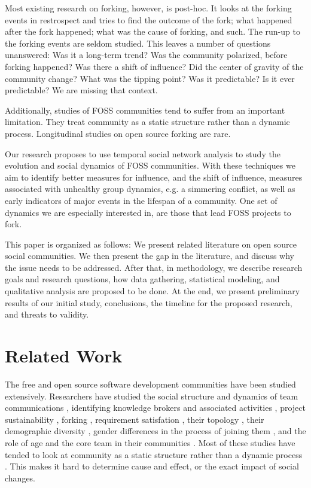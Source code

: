 \documentclass{acm_proc_article-sp}
\begin{document}
Most existing research on forking, however, is post-hoc. It looks at the forking events in restrospect and tries to find the outcome of the fork; what happened after the fork happened; what was the cause of forking, and such. The run-up to the forking events are seldom studied. This leaves a number of questions unanswered: Was it a long-term trend? Was the community polarized, before forking happened? Was there a shift of influence? Did the center of gravity of the community change? What was the tipping point? Was it predictable? Is it ever predictable? We are missing that context. 

Additionally, studies of FOSS communities tend to suffer from an important limitation. They treat community as a static structure rather than a dynamic process. Longitudinal studies on open source forking are rare.

Our research proposes to use temporal social network analysis to study the evolution and social dynamics of FOSS communities. With these techniques we aim to identify better measures for influence, and the shift of influence, measures associated with unhealthy group dynamics, e.g. a simmering conflict, as well as early indicators of major events in the lifespan of a community. One set of dynamics we are especially interested in, are those that lead FOSS projects to fork. 

This paper is organized as follows: We present related literature on open source social communities. We then present the gap in the literature, and discuss why the issue needs to be addressed. After that, in methodology, we describe research goals and research questions, how data gathering, statistical modeling, and qualitative analysis are proposed to be done. At the end, we present preliminary results of our initial study, conclusions, the timeline for the proposed research, and threats to validity.

\section{Related Work}
\label{relatedwork}

The free and open source software development communities have been studied extensively. Researchers have studied the social structure and dynamics of team communications \cite{Bird}\cite{HowisonSocialDynamics}\cite{HowisonFlossMole}\cite{Guzzi}\cite{Nakakoji}, identifying knowledge brokers and associated activities \cite{Sowe}, project sustainability \cite{NymanForkingSustainability}\cite{Nakakoji}, forking \cite{NymanCodeForking}, requirement satisfation \cite{Ernst}, their topology \cite{Bird}, their demographic diversity \cite{Kunegis}, gender differences in the process of joining them \cite{Kuechler}, and the role of age and the core team in their communities \cite{Torres}\cite{DavidsonVLHCC2014}\cite{AzarbakhtOSS2014}\cite{AzarbakhtINSNA2014}. Most of these studies have tended to look at community as a static structure rather than a dynamic process \cite{CrowstonFLOSSWhatWeKnow}. This makes it hard to determine cause and effect, or the exact impact of social changes.
\end{document}
